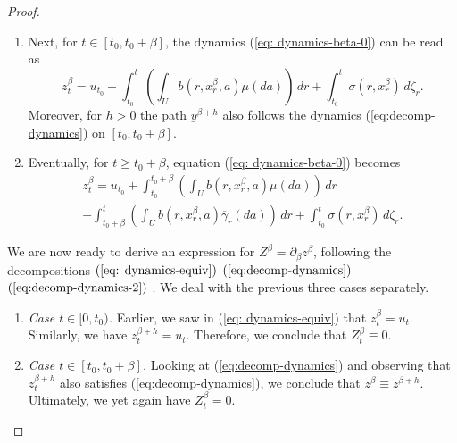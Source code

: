 \documentclass[12pt,reqno]{amsart}
\numberwithin{equation}{section}  %
\newcommand{\1}{{\bf 1}}
\newcommand{\2}{{\bf 2}}
\newcommand{\ga}{\gamma}
\newcommand{\lp}{\left(}
\newcommand{\rp}{\right)}
\theoremstyle{remark}
\theoremstyle{remark}
\begin{document}
\begin{proof}
\begin{enumerate}[wide, labelwidth=!, labelindent=0pt, label=\textnormal{(\alph*)}]
\item
Next, for $t\in[t_{0},t_{0}+\beta]$, the dynamics (\ref{eq: dynamics-beta-0}) can be read as
\begin{equation}\label{eq:decomp-dynamics}
    z_{t}^{\beta}={u}_{t_{0}}+\int_{t_{0}}^{t}\lp\int_{U}b(r,x_{r}^{\beta},a)\mu(da) \rp\,dr +\int_{t_{0}}^{t}\sigma(r,x_{r}^{\beta})\,d\zeta_{r} .
\end{equation}
Moreover, for $h>0$ the path $y^{\beta+h}$ also follows the dynamics (\ref{eq:decomp-dynamics}) on $[t_{0},t_{0}+\beta]$.

\item
Eventually, for $t\geq t_{0}+\beta$, equation (\ref{eq: dynamics-beta-0}) becomes
\begin{multline}\label{eq:decomp-dynamics-2}
z_{t}^{\beta}={u}_{t_{0}}+\int_{t_{0}}^{t_{0}+\beta}\lp \int_{U}b(r,x_{r}^{\beta},a)\mu(da) \rp\,dr \\
+\int_{t_{0}+\beta}^{t}\lp \int_{U}b(r,x_{r}^{\beta},a)  \overline{\ga}_{r}(da) \rp \,dr 
+ \int_{t_{0}}^{t}\sigma(r,x_{r}^{\beta})\,d\zeta_{r}.
\end{multline}
\end{enumerate}
We are now ready to derive an expression for $Z^{\beta}=\partial_{\beta}z^{\beta}$, following the decompositions $(\ref{eq: dynamics-equiv})$-$(\ref{eq:decomp-dynamics})$-$(\ref{eq:decomp-dynamics-2})$ . We deal with the previous three cases separately.

\begin{enumerate}[wide, labelwidth=!, labelindent=0pt, label=\emph{(\roman*)}]
\setlength\itemsep{.1in}     

\item \emph{Case $t\in [0,t_{0})$.}
    Earlier, we saw in (\ref{eq: dynamics-equiv}) that $z^{\beta}_{t}={u}_{t}$. Similarly, we have $z^{\beta +h}_{t}={u}_{t}$. Therefore, we conclude that $Z^{\beta}_{t}\equiv 0$.
    
    \item \emph{Case $t\in [t_{0},t_{0}+\beta]$.}
Looking at (\ref{eq:decomp-dynamics}) and observing that $z^{\beta+h}_{t}$ also satisfies (\ref{eq:decomp-dynamics}), we conclude that $z^{\beta}\equiv z^{\beta+h}$. Ultimately, we yet again have $Z^{\beta}_{t}=0$.
    

\end{enumerate}
\end{proof}
\end{document}
